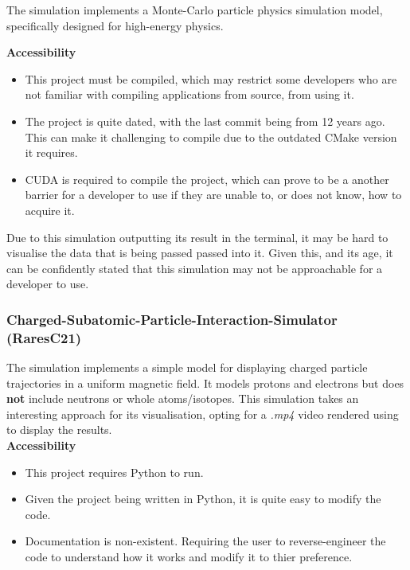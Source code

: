 The simulation  implements a Monte-Carlo particle physics simulation model, specifically designed for high-energy physics.

\break{}

\textbf{Accessibility}

\begin{itemize}
    \item This project must be compiled, which may restrict some developers who are not familiar with compiling applications from source, from using it.
    \item The project is quite dated, with the last commit being from 12 years ago. This can make it challenging to compile due to the outdated CMake version it requires.
    \item CUDA is required to compile the project, which can prove to be a another barrier for a developer to use if they are unable to, or does not know, how to acquire it.
\end{itemize}

Due to this simulation outputting its result in the terminal, it may be hard to visualise the data that is being passed passed into it.
Given this, and its age, it can be confidently stated that this simulation may not be approachable for a developer to use.

\subsubsection*{Charged-Subatomic-Particle-Interaction-Simulator (RaresC21)}

The simulation  implements a simple model for displaying charged particle trajectories in a uniform magnetic field. It models protons and electrons but does \textbf{not} include neutrons or whole atoms/isotopes.
This simulation takes an interesting approach for its visualisation, opting for a \textit{.mp4} video rendered using  to display the results.
\\
\textbf{Accessibility}

\begin{itemize}
    \item This project requires Python to run.
    \item Given the project being written in Python, it is quite easy to modify the code.
    \item Documentation is non-existent. Requiring the user to reverse-engineer the code to understand how it works and modify it to thier preference.
\end{itemize}

